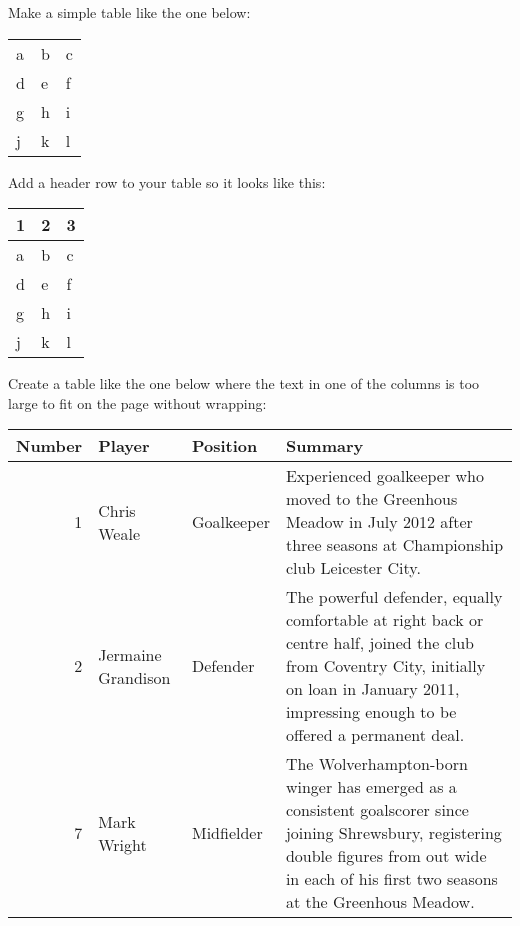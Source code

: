 \documentclass[11pt]{exam}
\begin{document}
\begin{questions}

\question Make a simple table like the one below:

\begin{center}
\begin{tabular}{l | l | l}
    a & b & c \\
    d & e & f \\
    g & h & i \\
    j & k & l \\
\end{tabular}
\end{center}

\question Add a header row to your table so it looks like this:

\begin{center}
\begin{tabular}{l | l | l}
	1 & 2 & 3 \\
	\hline
    a & b & c \\
    d & e & f \\
    g & h & i \\
    j & k & l \\
\end{tabular}
\end{center}

\question
Create a table like the one below where the text in one of the columns is too large to fit on the page without wrapping:

\begin{center}
    \begin{tabular}{ | r | l | l | p{6cm} |}
    \hline
   	Number & Player & Position & Summary \\ \hline
	1 & Chris Weale & Goalkeeper & Experienced goalkeeper who moved to the Greenhous Meadow in July 2012 after three seasons at Championship club Leicester City. \\ \hline
	2 & Jermaine Grandison & Defender & The powerful defender, equally comfortable at right back or centre half, joined the club from Coventry City, initially on loan in January 2011, impressing enough to be offered a permanent deal.\\ \hline
	7 & Mark Wright & Midfielder & The Wolverhampton-born winger has emerged as a consistent goalscorer since joining Shrewsbury, registering double figures from out wide in each of his first two seasons at the Greenhous Meadow.\\ \hline
    \end{tabular}
\end{center}


\end{questions}
\end{document}

